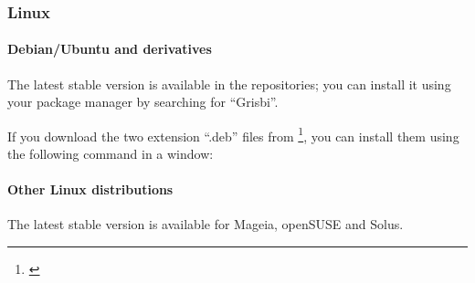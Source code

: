 \subsubsection{Linux\label{start-install-stable-linux}}

\paragraph{Debian/Ubuntu and derivatives}\mbox{}		%

The latest stable version is available in the repositories; you can install it using your package manager by searching for \enquote{Grisbi}.

If you download the two \gls{extension} \enquote{.deb} files from \footnote{\label{fn:sourceforgeStable}\urlSourceForgeGrisbiStable}, you can install them using the following command in a  window: %


\paragraph{Other Linux distributions}\mbox{}		%

The latest stable version is available for Mageia, openSUSE and Solus.

